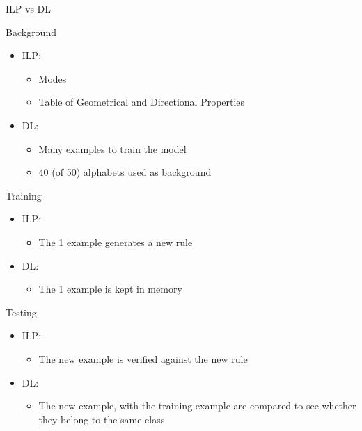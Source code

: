 \begin{frame}{ILP vs DL}

Background
\begin{itemize}
    \item ILP:
    \begin{itemize}
        \item Modes
        \item Table of Geometrical and Directional Properties
    \end{itemize}
    \item DL:
    \begin{itemize}
        \item Many examples to train the model 
        \item 40 (of 50) alphabets used as background
    \end{itemize}
\end{itemize}

Training
\begin{itemize}
    \item ILP:
    \begin{itemize}
        \item The 1 example generates a new rule
    \end{itemize}
    \item DL:
    \begin{itemize}
        \item The 1 example is kept in memory
    \end{itemize}
\end{itemize}

Testing
\begin{itemize}
    \item ILP:
    \begin{itemize}
        \item The new example is verified against the new rule
    \end{itemize}
    \item DL:
    \begin{itemize}
        \item The new example, with the training example are compared to see whether they belong to the same class
    \end{itemize}
\end{itemize}
    
\end{frame}

